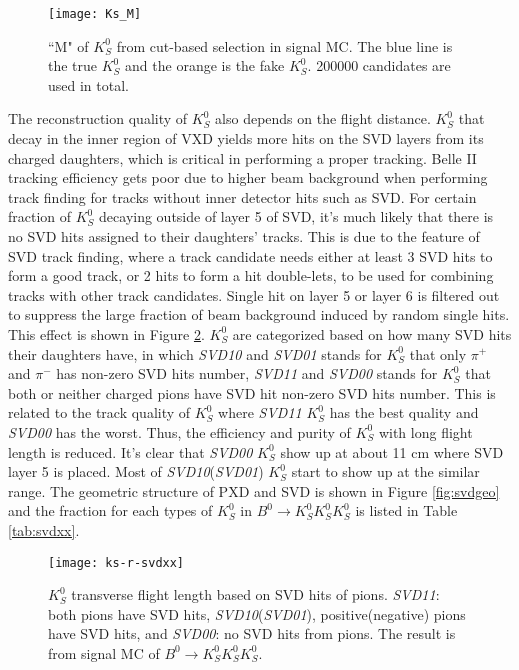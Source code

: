 \begin{figure}[ht]
	\centering 
	\texttt{[image: Ks\_M]}
	\caption{``M" of $K_S^0$ from cut-based selection in signal MC. The blue line is the true $K_S^0$ and the orange is the fake $K_S^0$. 200000 candidates are used in total. }
	\label{fig:ksM_sigmc}
\end{figure}
\begin{comment}
The $K_S^0$ candidates from ``stdKshort:merged" is the default way to obtain $K_S^0$ in the current BASF2, 
however, the limitation of this cut-based $K_S^0$ reconstruction is the pollution from fake $K_S^0$. Using these $K_S^0$ candidates to reconstruct $B^0 \to K_S^0  K_S^0  K_S^0$, as long as one of three $K_S^0$ is fake, the reconstructed $B^0$ is fake, too. 
\end{comment}

 The reconstruction quality of $K_S^0$ also depends on the flight distance. $K_S^0$ that decay in the inner region of VXD yields more hits on the SVD layers from its charged daughters, which is critical in performing a proper tracking. Belle II tracking efficiency gets poor due to higher beam background when performing track finding for tracks without inner detector hits such as SVD. For certain fraction of $K_S^0$ decaying outside of layer 5 of SVD, it's much likely that there is no SVD hits assigned to their daughters' tracks. This is due to the feature of SVD track finding, where a track candidate needs either at least 3 SVD hits to form a good track, or 2 hits to form a hit double-lets, to be used for combining tracks with other track candidates. Single hit on layer 5 or layer 6 is filtered out to suppress the large fraction of beam background induced by random single hits. This effect is shown in Figure \ref{fig:ks-r-svdxx}. $K_S^0$ are categorized based on how many SVD hits their daughters have, in which \textit{SVD10} and \textit{SVD01} stands for $K_S^0$ that only $\pi^+$ and $\pi^-$ has non-zero SVD hits number, \textit{SVD11} and \textit{SVD00} stands for $K_S^0$ that both or neither charged pions have SVD hit non-zero SVD hits number. This is related to the track quality of $K_S^0$ where \textit{SVD11} $K_S^0$ has the best quality and \textit{SVD00} has the worst. Thus, the efficiency and purity of $K_S^0$ with long flight length is reduced. It's clear that \textit{SVD00} $K_S^0$ show up at about 11 cm where SVD layer 5 is placed. Most of \textit{SVD10}(\textit{SVD01}) $K_S^0$ start to show up at the similar range. The geometric structure of PXD and SVD is shown in Figure \ref{fig:svdgeo} and the fraction for each types of $K_S^0$ in $B^0 \to K_S^0  K_S^0  K_S^0$ is listed in Table \ref{tab:svdxx}.
\begin{figure}[htpb]
	\centering
	\texttt{[image: ks-r-svdxx]}
	\caption{$K_S^0$ transverse flight length based on SVD hits of pions. \textit{SVD11}: both pions have SVD hits, \textit{SVD10}(\textit{SVD01}), positive(negative) pions have SVD hits, and \textit{SVD00}: no SVD hits from pions. The result is from signal MC of $B^0 \to K_S^0  K_S^0  K_S^0$.}
	\label{fig:ks-r-svdxx}
\end{figure}

